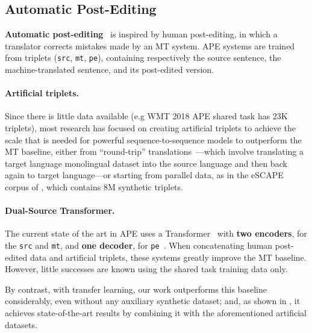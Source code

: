 \subsection{Automatic Post-Editing}
\label{sec:ape_bg}

{\bf Automatic post-editing}~\citep[APE;][]{simard2007rule} is
inspired by human post-editing, in which a translator corrects
mistakes made by an MT system. APE systems are trained from triplets
({\tt src}, {\tt mt}, {\tt pe}), containing respectively the source
sentence, the machine-translated sentence, and its post-edited
version.

\paragraph*{Artificial triplets.} Since there is little data
available (e.g WMT 2018 APE shared task has 23K triplets), most
research has focused on creating artificial triplets to achieve the
scale that is needed for powerful sequence-to-sequence models to
outperform the MT baseline, either from ``round-trip''
translations~\citep{junczys2016log}---which involve translating a
target language monolingual dataset into the source language and then
back again to target language---or starting from parallel data, as in
the eSCAPE corpus of \citet{negri2018escape}, which contains 8M
synthetic triplets.

\paragraph*{Dual-Source Transformer.} The current state of the art in
APE uses a Transformer~\citep{vaswani2017attention} with {\bf two
encoders}, for the {\tt src} and {\tt mt}, and {\bf one decoder}, for
{\tt pe}~\citep{junczys2018ms, tebbifakhr2018multi}. When
concatenating human post-edited data and artificial triplets, these
systems greatly improve the MT baseline. However, little successes
are known using the shared task training data only.

By contrast, with transfer learning, our work outperforms this
baseline considerably, even without any auxiliary synthetic dataset;
and, as shown in , it achieves
state-of-the-art results by combining it with the aforementioned
artificial datasets.